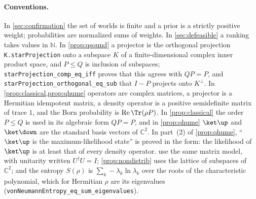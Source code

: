 \paragraph{Conventions.} In \cref{sec:confirmation} the set of worlds is finite and a prior is a
strictly positive weight; probabilities are normalized sums of weights. In
\cref{sec:defeasible} a ranking takes values in $\mathbb N$.
In \cref{prop:qsound} a projector is the
orthogonal projection \texttt{K.starProjection} onto a subspace $K$ of a finite-dimensional complex
inner product space, and $P\le Q$ is inclusion of subspaces; \texttt{starProjection\_comp\_eq\_iff}
proves that this agrees with $QP=P$, and \texttt{starProjection\_orthogonal\_eq\_sub} that
$I-P$ projects onto $K^\perp$. In \cref{prop:classical,prop:qhume} operators are complex matrices,
a projector is a Hermitian idempotent matrix, a density operator is a positive semidefinite matrix of
trace $1$, and the Born probability is $\operatorname{Re}\Tr(\rho P)$. In \cref{prop:classical}
the order $P\le Q$ is used in its algebraic form $QP=P$, and in \cref{prop:qhume} $\ket\up$ and
$\ket\down$ are the standard basis vectors of $\mathbb C^2$. In part~(2) of \cref{prop:qhume},
``$\ket\up$ is the maximum-likelihood state'' is proved in the form: the likelihood of $\ket\up$
is at least that of every density operator.  use the same matrix model, with
unitarity written $U^\dagger U=I$; \cref{prop:nondistrib} uses the lattice of subspaces of
$\mathbb C^2$; and the entropy $S(\rho)$ is $\sum_k-\lambda_k\ln\lambda_k$ over the roots of the
characteristic polynomial, which for Hermitian $\rho$ are its eigenvalues
(\texttt{vonNeumannEntropy\_eq\_sum\_eigenvalues}).

